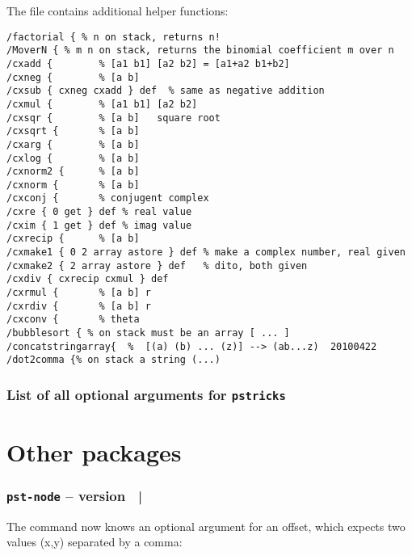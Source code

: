 \documentclass[11pt,english,BCOR10mm,DIV12,bibliography=totoc,parskip=false,smallheadings
    headexclude,footexclude,oneside]{pst-doc}
\let\Lfile\LFile
\let\pstnodeFV\fileversion
\let\pstnodeFD\filedate
\begin{document}
The file \Lfile{pst-tools.pro} contains additional helper functions:

\begin{lstlisting}
/factorial { % n on stack, returns n! 
/MoverN { % m n on stack, returns the binomial coefficient m over n
/cxadd {		% [a1 b1] [a2 b2] = [a1+a2 b1+b2]
/cxneg {		% [a b]
/cxsub { cxneg cxadd } def  % same as negative addition
/cxmul {		% [a1 b1] [a2 b2]
/cxsqr {		% [a b]   square root
/cxsqrt {		% [a b]
/cxarg { 		% [a b] 
/cxlog {		% [a b]
/cxnorm2 {		% [a b]
/cxnorm {		% [a b]
/cxconj {		% conjugent complex
/cxre { 0 get } def	% real value
/cxim { 1 get } def	% imag value
/cxrecip {		% [a b]
/cxmake1 { 0 2 array astore } def % make a complex number, real given
/cxmake2 { 2 array astore } def	  % dito, both given
/cxdiv { cxrecip cxmul } def
/cxrmul {		% [a b] r
/cxrdiv {		% [a b] r
/cxconv {		% theta
/bubblesort { % on stack must be an array [ ... ]
/concatstringarray{  %  [(a) (b) ... (z)] --> (ab...z)  20100422
/dot2comma {% on stack a string (...) 
\end{lstlisting}




\section{List of all optional arguments for \texttt{pstricks}}

\makeatletter
{}
\makeatother


\clearpage
\part{Other packages}
\section{\texttt{pst-node} -- version \pstnodeFV\ | \pstnodeFD}
The command  now knows an optional argument for an offset, which
expects two values (x,y) separated by a comma:
\end{document}
